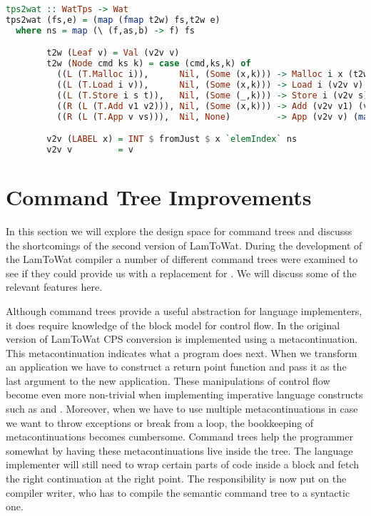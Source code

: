 \begin{lstlisting}[language=Haskell]
tps2wat :: WatTps -> Wat
tps2wat (fs,e) = (map (fmap t2w) fs,t2w e)
  where ns = map (\ (f,as,b) -> f) fs

        t2w (Leaf v) = Val (v2v v)
        t2w (Node cmd ks k) = case (cmd,ks,k) of
          ((L (T.Malloc i)),      Nil, (Some (x,k))) -> Malloc i x (t2w k)
          ((L (T.Load i v)),      Nil, (Some (x,k))) -> Load i (v2v v) x (t2w k)
          ((L (T.Store i s t)),   Nil, (Some (_,k))) -> Store i (v2v s) (v2v t) (t2w k)
          ((R (L (T.Add v1 v2))), Nil, (Some (x,k))) -> Add (v2v v1) (v2v v2) x (t2w k)
          ((R (L (T.App v vs))),  Nil, None)         -> App (v2v v) (map v2v vs)

        v2v (LABEL x) = INT $ fromJust $ x `elemIndex` ns
        v2v v         = v
\end{lstlisting}

\section{\label{section:ctreebetter}Command Tree Improvements}
In this section we will explore the design space for command trees and discusss the shortcomings of the second version of LamToWat. During the development of the LamToWat compiler a number of different command trees were examined to see if they could provide us with a replacement for . We will discuss some of the relevant features here.

Although command trees provide a useful abstraction for language implementers, it does require knowledge of the block model for control flow. In the original version of LamToWat CPS conversion is implemented using a metacontinuation. This metacontinuation indicates what a program does next. When we transform an application we have to construct a return point function and pass it as the last argument to the new application. These manipulations of control flow become even more non-trivial when implementing imperative language constructs such as  and . Moreover, when we have to use multiple metacontinuations in case we want to throw exceptions or break from a  loop, the bookkeeping of metacontinuations becomes cumbersome. Command trees help the programmer somewhat by having these metacontinuations live inside the tree. The language implementer will still need to wrap certain parts of code inside a block and fetch the right continuation at the right point. The responsibility is now put on the compiler writer, who has to compile the semantic command tree to a syntactic one.

